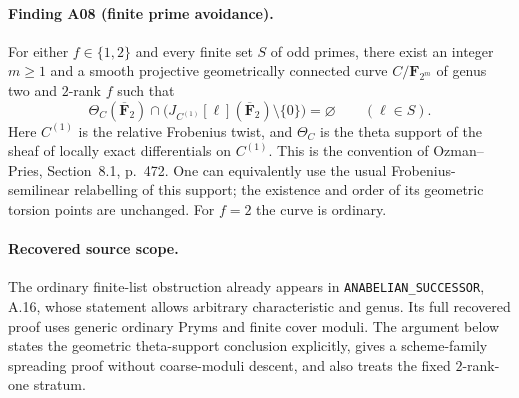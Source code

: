 \documentclass[11pt,a4paper]{article}
\begin{document}
\paragraph{Finding A08 (finite prime avoidance).}
For either $f\in\{1,2\}$ and every finite set $S$ of odd primes, there
exist an integer $m\ge1$ and a smooth projective geometrically connected
curve $C/\mathbf F_{2^m}$ of genus two and $2$-rank $f$ such that
\[
 \Theta_C(\overline{\mathbf F}_2)\cap
 \bigl(J_{C^{(1)}}[\ell](\overline{\mathbf F}_2)\setminus\{0\}\bigr)
 =\varnothing\qquad(\ell\in S).
 \tag{FP.1}
\]
Here $C^{(1)}$ is the relative Frobenius twist, and $\Theta_C$ is the
theta support of the sheaf of locally exact differentials on $C^{(1)}$.
This is the convention of Ozman--Pries, Section~8.1, p.~472.
One can equivalently use the usual Frobenius-semilinear relabelling of
this support; the existence and order of its geometric torsion points
are unchanged.  For $f=2$ the curve is ordinary.

\paragraph{Recovered source scope.}
The ordinary finite-list obstruction already appears in
\texttt{ANABELIAN\_SUCCESSOR}, A.16, whose statement allows arbitrary
characteristic and genus.  Its full recovered proof uses generic
ordinary Pryms and finite cover moduli.  The argument below states the
geometric theta-support conclusion explicitly, gives a scheme-family
spreading proof without coarse-moduli descent, and also treats the
fixed $2$-rank-one stratum.
\end{document}
